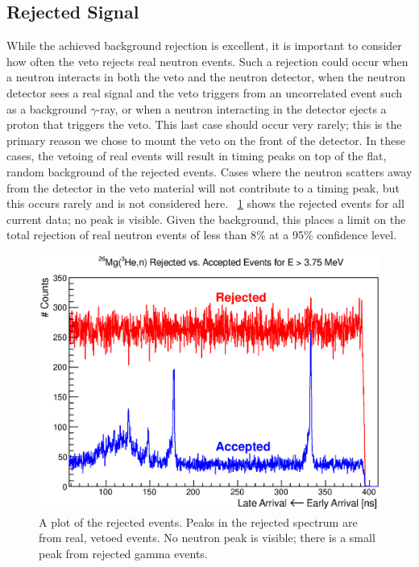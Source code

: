 \subsection{Rejected Signal}

While the achieved background rejection is excellent, it is important to consider how often the veto rejects real neutron events.  Such a rejection could occur when a neutron interacts in both the veto and the neutron detector, when the neutron detector sees a real signal and the veto triggers from an uncorrelated event such as a background $\gamma$-ray, or when a neutron interacting in the detector ejects a proton that triggers the veto.  This last case should occur very rarely; this is the primary reason we chose to mount the veto on the front of the detector.    In these cases, the vetoing of real events will result in timing peaks on top of the flat, random background of the rejected events.  Cases where the neutron scatters away from the detector in the veto material will not contribute to a timing peak, but this occurs rarely and is not considered here.  {\fig}~\ref{fig:rejectionTOF} shows the rejected events for all current  data; no peak is visible.  Given the background, this places a limit on the total rejection of real neutron events of less than 8\% at a 95\% confidence level.  
\begin{figure}[!htbp]
\centering
\includegraphics[width=5in]{figures/26Mg_rejection_newEnergyCut.eps}
\caption{\label{fig:rejection}A plot of the rejected events.  Peaks in the rejected spectrum are from real, vetoed events.  No neutron peak is visible; there is a small peak from rejected gamma events.}
\label{fig:rejectionTOF}
\end{figure}

